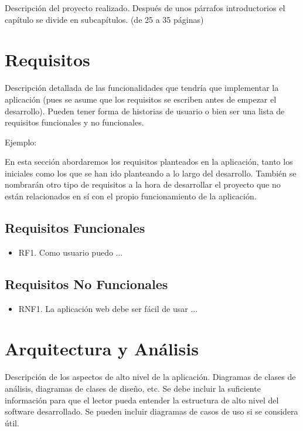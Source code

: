 Descripción del proyecto realizado. Después de unos párrafos introductorios el capítulo se divide en subcapítulos. (de 25 a 35 páginas)

\section{Requisitos}

Descripción detallada de las funcionalidades que tendría que implementar la aplicación (pues se asume que los requisitos se escriben antes de empezar el desarrollo). Pueden tener forma de historias de usuario o bien ser una lista de requisitos funcionales y no funcionales.

Ejemplo:

En esta sección abordaremos los requisitos planteados en la aplicación, tanto los iniciales como los que se han ido planteando a lo largo del desarrollo. 
También se nombrarán otro tipo de requisitos a la hora de desarrollar el proyecto que no están relacionados en sí con el propio funcionamiento de la aplicación.

\subsection{Requisitos Funcionales}

\begin{itemize}
    \item RF1. Como usuario puedo ...
\end{itemize}

\subsection{Requisitos No Funcionales}

\begin{itemize}
    \item RNF1. La aplicación web debe ser fácil de usar ...
\end{itemize}

\section{Arquitectura y Análisis}

Descripción de los aspectos de alto nivel de la aplicación. Diagramas de clases de análisis, diagramas de clases de diseño, etc. Se debe incluir la suficiente información para que el lector pueda entender la estructura de alto nivel del software desarrollado. Se pueden incluir diagramas de casos de uso si se considera útil.

